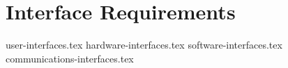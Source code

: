 \chapter{Interface Requirements} \label{chap:externalinterfacerequirements}

{user-interfaces.tex}
\newpage
{hardware-interfaces.tex}
\newpage
{software-interfaces.tex}
\newpage
{communications-interfaces.tex}
\newpage
